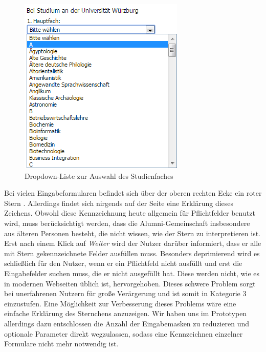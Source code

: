 \begin{figure}
	\centering
		\includegraphics{figures/dropdownlist.png}
	\caption{Dropdown-Liste zur Auswahl des Studienfaches}
	\label{fig:regdropdown}
\end{figure}

{ Bei vielen Eingabeformularen befindet sich über der oberen rechten Ecke ein roter Stern \glqq *\grqq. Allerdings findet sich nirgends auf der Seite eine Erklärung dieses Zeichens.
Obwohl diese Kennzeichnung heute allgemein für Pflichtfelder benutzt wird, muss berücksichtigt werden, dass die Alumni-Gemeinschaft insbesondere aus älteren Personen besteht, die nicht wissen, wie der Stern zu interpretieren ist. Erst nach einem Klick auf \emph{Weiter} wird der Nutzer darüber informiert, dass er alle mit Stern gekennzeichnete Felder ausfüllen muss.
}
{ Besonders deprimierend wird es schließlich für den Nutzer, wenn er ein Pflichtfeld nicht ausfüllt und erst die Eingabefelder suchen muss, die er nicht ausgefüllt hat. Diese werden nicht, wie es in modernen Webseiten üblich ist, hervorgehoben. Dieses schwere Problem sorgt bei unerfahrenen Nutzern für große Verärgerung und ist somit in Kategorie 3 einzustufen.
}
{ Eine Möglichkeit zur Verbesserung dieses Problems wäre eine einfache Erklärung des Sternchens anzuzeigen. Wir haben uns im Prototypen allerdings dazu entschlossen die Anzahl der Eingabemasken zu reduzieren und optionale Parameter direkt wegzulassen, sodass eine Kennzeichnen einzelner Formulare nicht mehr notwendig ist.
}

